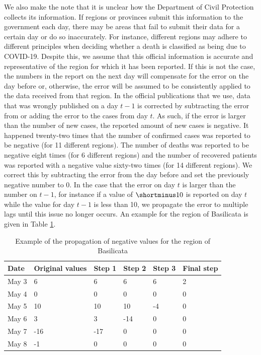 \documentclass[12pt]{article}
\begin{document}
	We also make the note that it is unclear how the Department of Civil Protection collects its information. If regions or provinces submit this information to the government each day, there may be areas that fail to submit their data for a certain day or do so inaccurately. For instance, different regions may adhere to different principles when deciding whether a death is classified as being due to COVID-19. Despite this, we assume that this official information is accurate and representative of the region for which it has been reported. If this is not the case, the numbers in the report on the next day will compensate for the error on the day before or, otherwise, the error will be assumed to be consistently applied to the data received from that region. In the official publications that we use, data that was wrongly published on a day $t-1$ is corrected by subtracting the error from or adding the error to the cases from day $t$. As such, if the error is larger than the number of new cases, the reported amount of new cases is negative. It happened twenty-two times that the number of confirmed cases was reported to be negative (for 11 different regions). The number of deaths was reported to be negative eight times (for 6 different regions) and the number of recovered patients was reported with a negative value sixty-two times (for 14 different regions). We correct this by subtracting the error from the day before and set the previously negative number to 0. In the case that the error on day $t$ is larger than the number on $t-1$, for instance if a value of $\shortminus10$ is reported on day $t$ while the value for day $t-1$ is less than 10, we propagate the error to multiple lags until this issue no longer occurs. An example for the region of Basilicata is given in Table \ref{tab:example_propagation_negative_values}.
	
	\begin{table}[H]
		\centering
		\caption{Example of the propagation of negative values for the region of Basilicata}
		\label{tab:example_propagation_negative_values}
		\begin{tabular}{llllll}
			\toprule
			Date    & Original values   & Step 1 & Step 2 & Step 3 & Final step \\ \midrule
            May 3   & 6                 & 6      & 6      & 6      & 2          \\
            May 4   & 0                 & 0      & 0      & 0      & 0          \\
            May 5   & 10                & 10     & 10     & -4     & 0          \\
            May 6   & 3                 & 3      & -14    & 0      & 0          \\
            May 7   & -16               & -17    & 0      & 0      & 0          \\
            May 8   & -1                & 0      & 0      & 0      & 0          \\ \bottomrule
		\end{tabular}
	\end{table}
	
\end{document}
